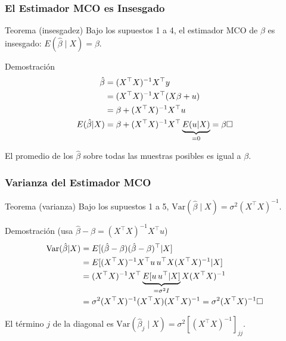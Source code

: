 \documentclass{beamer}
\begin{document}
\begin{frame}
\frametitle{El Estimador MCO es Insesgado}

\begin{alertblock}{Teorema (insesgadez)}
Bajo los supuestos 1 a 4, el estimador MCO de $\beta$ es insesgado: $E(\hat{\beta}\mid X) = \beta$.
\end{alertblock}

\begin{exampleblock}{Demostración}
    \begin{align*}
        \hat{\beta} &= (X^{\top}X)^{-1}X^{\top}y \\
        &= (X^{\top}X)^{-1}X^{\top}(X\beta + u) \\
        &= \beta + (X^{\top}X)^{-1}X^{\top}u \\
        E(\hat{\beta}|X) &= \beta + (X^{\top}X)^{-1}X^{\top}\underbrace{E(u|X)}_{=0} = \beta \hfill \square
    \end{align*}
\end{exampleblock}
El promedio de los $\hat{\beta}$ sobre todas las muestras posibles es igual a $\beta$.
\end{frame}
\begin{frame}
\frametitle{Varianza del Estimador MCO}

\begin{alertblock}{Teorema (varianza)}
Bajo los supuestos 1 a 5, $\text{Var}(\hat{\beta}\mid X) = \sigma^2(X^{\top}X)^{-1}$.
\end{alertblock}

\begin{exampleblock}{Demostración (usa $\hat{\beta}-\beta=(X^{\top}X)^{-1}X^{\top}u$)}
    \begin{align*}
        \text{Var}(\hat{\beta}|X) &= E[(\hat{\beta} - \beta)(\hat{\beta} - \beta)^{\top}|X] \\
        &= E[(X^{\top}X)^{-1}X^{\top}u \, u^{\top}X(X^{\top}X)^{-1}|X] \\
        &= (X^{\top}X)^{-1}X^{\top}\underbrace{E[u \, u^{\top}|X]}_{=\sigma^2 I}X(X^{\top}X)^{-1} \\
        &= \sigma^2(X^{\top}X)^{-1}(X^{\top}X)(X^{\top}X)^{-1} = \sigma^2(X^{\top}X)^{-1} \hfill \square
    \end{align*}
\end{exampleblock}
El término $j$ de la diagonal es $\text{Var}(\hat{\beta}_j\mid X)=\sigma^2 [(X^{\top}X)^{-1}]_{jj}$.
\end{frame}
\end{document}
